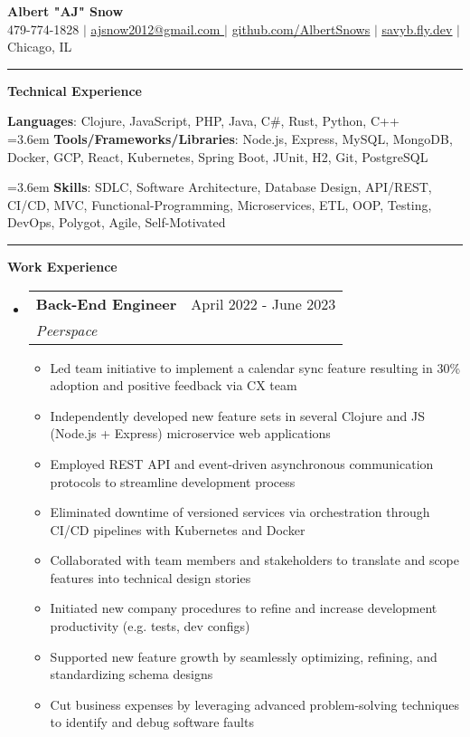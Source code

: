 \documentclass[letterpaper,11pt]{article}
\makeatletter
\newcommand{\resumeItem}[1]{
  \item\small{
    {#1 \vspace{-2pt}}
  }
}
\newcommand{\resumeSubheading}[4]{
  \vspace{-2pt}\item
    \begin{tabular*}{0.97\textwidth}[t]{l@{\extracolsep{\fill}}r}
      \textbf{#1} & #2 \\
      \textit{\small#3} & \textit{\small #4} \\
    \end{tabular*}\vspace{0pt}
}
\newcommand{\resumeSubHeadingListStart}{\begin{itemize}[leftmargin=0.15cm, label={}]}
\newcommand{\resumeSubHeadingListEnd}{\end{itemize}}
\newcommand{\resumeItemListStart}{\begin{itemize}}
\newcommand{\resumeItemListEnd}{\end{itemize}\vspace{-5pt}}
\makeatother
\begin{document}
\textbf{\normalshape \Large \textcolor{magic_blue}{Albert "AJ" Snow}} \\ \vspace{3pt}
\small 479-774-1828 $|$ 
\href{ mailto:ajsnow2012@gmail.com }
{\underline{ ajsnow2012@gmail.com }} $|$
\href{https://github.com/AlbertSnows}{\underline{github.com/AlbertSnows}}
$|$ \href{https://savyb.fly.dev/}{\underline{savyb.fly.dev}}
$|$ Chicago, IL
\noindent\rule{19.5cm}{0.4pt}

%
\textbf{\large \textcolor{magic_blue}{Technical Experience} }
\begin{onehalfspace}

  \textbf{ Languages}{: Clojure, JavaScript, PHP, Java, C\#, Rust, Python, C++ } \\

  \hangindent=3.6em
  \textbf{ Tools/Frameworks/Libraries}{:
    Node.js, Express, MySQL, MongoDB, Docker,
    GCP, React, Kubernetes, Spring Boot, JUnit, H2,
    Git,  PostgreSQL } \\
\end{onehalfspace}

\hangindent=3.6em
\textbf{ Skills}{: }
SDLC, Software Architecture, Database Design, API/REST, CI/CD,
MVC, Functional-Programming, Microservices, ETL, OOP, Testing,
DevOps, Polygot, Agile, Self-Motivated
\noindent\rule{19.5cm}{0.4pt}

\textbf{\large \textcolor{magic_blue}{Work Experience}}
\resumeSubHeadingListStart
\resumeSubheading
{Back-End Engineer}{April 2022 - June 2023}
{Peerspace}{}
\resumeItemListStart
\resumeItem{ Led team initiative to implement a calendar sync feature resulting in 30\% adoption and positive feedback via CX team}
\resumeItem{ Independently developed new feature sets in several Clojure and JS (Node.js + Express) microservice web applications}
\resumeItem{ Employed REST API and event-driven asynchronous communication protocols to streamline development process}
\resumeItem{ Eliminated downtime of versioned services via orchestration through CI/CD pipelines with Kubernetes and Docker }
\resumeItem{ Collaborated with team members and stakeholders to translate and scope features into technical design stories}
\resumeItem{ Initiated new company procedures to refine and increase development productivity (e.g. tests, dev configs)}
\resumeItem{ Supported new feature growth by seamlessly optimizing, refining, and standardizing schema designs }
\resumeItem{ Cut business expenses by leveraging advanced problem-solving techniques to identify and debug software faults}
\resumeItemListEnd
\resumeSubHeadingListEnd
\end{document}
